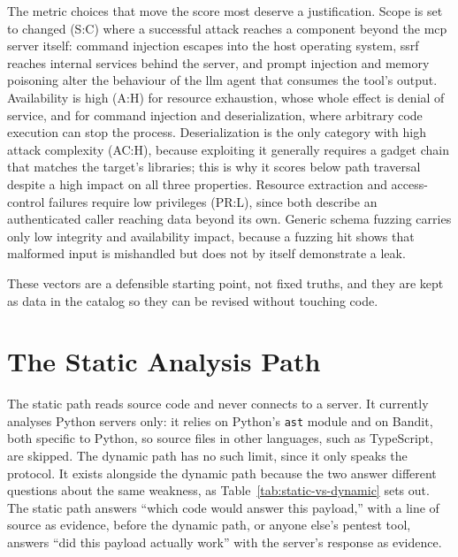 The metric choices that move the score most deserve a justification. Scope is set to changed (S:C) where a successful attack reaches a component beyond the \gls{mcp} server itself: command injection escapes into the host operating system, \gls{ssrf} reaches internal services behind the server, and prompt injection and memory poisoning alter the behaviour of the \gls{llm} agent that consumes the tool's output. Availability is high (A:H) for resource exhaustion, whose whole effect is denial of service, and for command injection and deserialization, where arbitrary code execution can stop the process. Deserialization is the only category with high attack complexity (AC:H), because exploiting it generally requires a gadget chain that matches the target's libraries; this is why it scores below path traversal despite a high impact on all three properties. Resource extraction and access-control failures require low privileges (PR:L), since both describe an authenticated caller reaching data beyond its own. Generic schema fuzzing carries only low integrity and availability impact, because a fuzzing hit shows that malformed input is mishandled but does not by itself demonstrate a leak.

These vectors are a defensible starting point, not fixed truths, and they are kept as data in the catalog so they can be revised without touching code.

\section{The Static Analysis Path}
\label{sec:static}
\label{sec:static-impl}

The static path reads source code and never connects to a server. It currently analyses Python servers only: it relies on Python's \texttt{ast} module and on Bandit, both specific to Python, so source files in other languages, such as TypeScript, are skipped. The dynamic path has no such limit, since it only speaks the protocol. It exists alongside the dynamic path because the two answer different questions about the same weakness, as Table~\ref{tab:static-vs-dynamic} sets out. The static path answers ``which code would answer this payload,'' with a line of source as evidence, before the dynamic path, or anyone else's pentest tool, answers ``did this payload actually work'' with the server's response as evidence.

